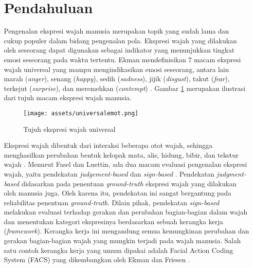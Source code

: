 \documentclass[review,3p,12pt]{elsarticle}
\begin{document}

\section{Pendahuluan}
\label{intro}

Pengenalan ekspresi wajah manusia merupakan topik yang sudah lama dan cukup populer dalam bidang pengenalan pola. Ekspresi wajah yang dilakukan oleh seseorang dapat digunakan sebagai indikator yang menunjukkan tingkat emosi seseorang pada waktu tertentu. Ekman mendefinisikan 7 macam ekspresi wajah universal yang mampu mengindikasikan emosi seseorang, antara lain marah (\textit{anger}), senang (\textit{happy}), sedih (\textit{sadness}), jijik (\textit{disgust}), takut (\textit{fear}), terkejut (\textit{surprise}), dan meremehkan (\textit{contempt}) \cite{ekman1971constants}. Gambar \ref{fig:universalemot} merupakan ilustrasi dari tujuh macam ekspresi wajah manusia.

\begin{figure}[hbt!]
\caption{Tujuh ekspresi wajah universal}
\label{fig:universalemot}
\centering
	\texttt{[image: assets/universalemot.png]}
\end{figure}

Ekspresi wajah dibentuk dari interaksi beberapa otot wajah, sehingga menghasilkan perubahan bentuk kelopak mata, alis, hidung, bibir, dan tekstur wajah \cite{fasel2003automatic}. Menurut Fasel dan Luettin, ada dua macam evaluasi pengenalan ekspresi wajah, yaitu pendekatan \textit{judgement-based} dan \textit{sign-based} \cite{fasel2003automatic}. Pendekatan \textit{judgment-based} didasarkan pada penentuan \textit{ground-truth} ekspresi wajah yang dilakukan oleh manusia juga. Oleh karena itu, pendekatan ini sangat bergantung pada reliabilitas penentuan \textit{ground-truth}. Dilain pihak, pendekatan \textit{sign-based} melakukan evaluasi terhadap gerakan dan perubahan bagian-bagian dalam wajah dan menentukan kategori ekspresinya berdasarkan sebuah kerangka kerja (\textit{framework}). Kerangka kerja ini mengandung semua kemungkinan perubahan dan gerakan bagian-bagian wajah yang mungkin terjadi pada wajah manusia. Salah satu contoh kerangka kerja yang umum dipakai adalah Facial Action Coding System (FACS) yang dikembangkan oleh Ekman dan Friesen \cite{ekman1977facial}.
\end{document}
